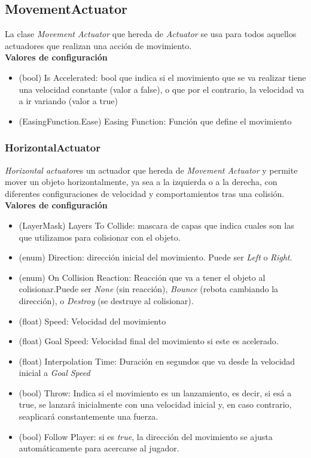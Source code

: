 \subsection{MovementActuator}
La clase \textit{Movement Actuator} que hereda de \textit{Actuator} se usa para todos aquellos actuadores que realizan una acción de movimiento. \\
\textbf{Valores de configuración}
\begin{itemize}
	\item (bool) Is Accelerated: bool que indica si el movimiento que se va realizar tiene una velocidad constante (valor a false), o que por el contrario, la velocidad va a ir variando (valor a true)
	\item (EasingFunction.Ease) Easing Function: Función que define el movimiento 
\end{itemize}

\subsubsection{HorizontalActuator}
\textit{Horizontal actuator}es un actuador que hereda de \textit{Movement Actuator} y permite mover un objeto horizontalmente, ya sea a la izquierda o a la derecha, con diferentes configuraciones de velocidad y comportamientos tras una colisión.\\
\textbf{Valores de configuración}
\begin{itemize}
	\item (LayerMask) Layers To Collide: mascara de capas que indica cuales son las que utilizamos para colisionar con el objeto.
	\item (enum) Direction: dirección inicial del movimiento. Puede ser \textit{Left} o \textit{Right}.
	\item (enum) On Collision Reaction: Reacción que va a tener el objeto al colisionar.Puede ser \textit{None} (sin reacción), \textit{Bounce} (rebota cambiando la dirección), o \textit{Destroy} (se destruye al colisionar).
	\item (float) Speed: Velocidad del movimiento
	\item (float) Goal Speed: Velocidad final del movimiento si este es acelerado.
	\item (float) Interpolation Time: Duración en segundos que va desde la velocidad inicial a \textit{ Goal Speed}
	\item (bool) Throw: Indica si el movimiento es un lanzamiento, es decir, si esá a true, se lanzará inicialmente con una velocidad inicial y, en caso contrario, seaplicará constantemente una fuerza.
	\item (bool) Follow Player: si es \textit{true}, la dirección del movimiento se ajusta automáticamente para acercarse al jugador.
\end{itemize}

